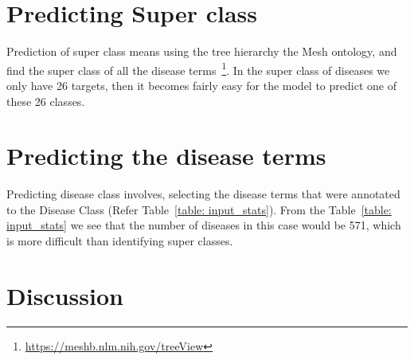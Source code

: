 \section{Predicting Super class}
Prediction of super class means using the tree hierarchy the Mesh ontology, and find the super class of all the disease terms~\footnote{\url{https://meshb.nlm.nih.gov/treeView}}. In the super class of diseases we only have 26 targets, then it becomes fairly easy for the model to predict one of these 26 classes. 



\section{Predicting the disease terms}
Predicting disease class involves, selecting the disease terms that were annotated to the Disease Class (Refer Table~\ref{table: input_stats}). From the Table~\ref{table: input_stats} we see that the number of diseases in this case would be 571, which is more difficult than identifying super classes. 

\section{Discussion}
\fi

